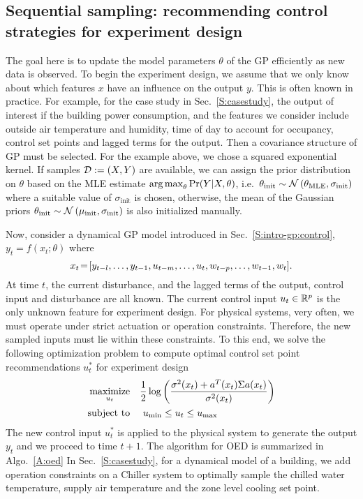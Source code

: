 \subsection{Sequential sampling: recommending control strategies for experiment design }

The goal here is to update the model parameters \(\theta\) of the GP efficiently as new data is observed. 
To begin the experiment design, we assume that we only know about which features \(x\) have an influence on the output \(y\). This is often known in practice. For example, for the case study in Sec.~\ref{S:casestudy}, the output of interest if the building power consumption, and the features we consider include outside air temperature and humidity, time of day to account for occupancy, control set points and lagged terms for the output. Then a covariance structure of GP must be selected. For the example above, we chose a squared exponential kernel.
If samples \(\mathcal{D} := (X,Y)\) are available, we can assign the prior distribution on \(\theta\) based on the MLE estimate \( \operatorname*{arg\,max}_\theta \Pr(Y \vert X, \theta)\), i.e.~\(\theta_{\mathrm{init}} \sim \operatorname*{\mathcal{N}}\left(\theta_{\mathrm{MLE}}, \sigma_{\mathrm{init}}\right)\) where a suitable value of \(\sigma_{\mathrm{init}}\) is chosen, otherwise, the mean of the Gaussian priors \(\theta_{\mathrm{init}} \sim \operatorname*{\mathcal{N}}\left(\mu_{\mathrm{{init}}}, \sigma_\mathrm{init}\right)\) is also initialized manually.

Now, consider a dynamical GP model introduced in Sec.~\ref{S:intro-gp:control},
\begin{math}
y_{t} = f(x_t;\theta)
\end{math}
where
\begin{equation*}
x_{t}\!=\![y_{t-l}, \dots, y_{t-1}, u_{t-m}, \dots, u_t, w_{t-p}, \dots, w_{t-1}, w_t] \text.
\end{equation*}
At time \(t\), the current disturbance, and the lagged terms of the output, control input and disturbance are all known. The current control input \(u_t \in \mathbb{R}^p \) is the only unknown feature for experiment design. For physical systems, very often, we must operate under strict actuation or operation constraints. Therefore, the new sampled inputs must lie within these constraints. To this end, we solve the following optimization problem to compute optimal control set point recommendations \(u^*_t\) for experiment design
\begin{align}
\maximize_{u_{t}} & \ \ \ \frac{1}{2}\log\left(\frac{\sigma^2(x_t)+a^T(x_t)\Sigma a(x_t)}{\sigma^2(x_t)}\right) \\
\st &  \ \ \ \     u_{\mathrm{min}}  \leq u_t \leq u_{\mathrm{max}} \nonumber
\end{align}
The new control input \(u^*_t\) is applied to the physical system to generate the output \(y_t\) and we proceed to time \(t+1\). 
The algorithm for OED is summarized in Algo.~\ref{A:oed}
In Sec.~\ref{S:casestudy}, for a dynamical model of a building, we add operation constraints on a Chiller system to optimally sample the chilled water temperature, supply air temperature and the zone level cooling set point. 

